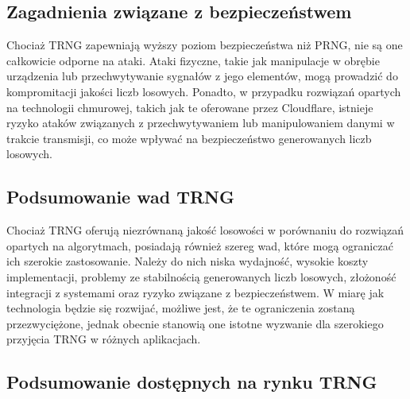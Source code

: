 \subsection{Zagadnienia związane z bezpieczeństwem}

Chociaż TRNG zapewniają wyższy poziom bezpieczeństwa niż PRNG, nie są one całkowicie odporne na ataki. Ataki fizyczne, takie jak manipulacje w obrębie urządzenia lub przechwytywanie sygnałów z jego elementów, mogą prowadzić do kompromitacji jakości liczb losowych. Ponadto, w przypadku rozwiązań opartych na technologii chmurowej, takich jak te oferowane przez Cloudflare, istnieje ryzyko ataków związanych z przechwytywaniem lub manipulowaniem danymi w trakcie transmisji, co może wpływać na bezpieczeństwo generowanych liczb losowych.

\subsection{Podsumowanie wad TRNG}

Chociaż TRNG oferują niezrównaną jakość losowości w porównaniu do rozwiązań opartych na algorytmach, posiadają również szereg wad, które mogą ograniczać ich szerokie zastosowanie. Należy do nich niska wydajność, wysokie koszty implementacji, problemy ze stabilnością generowanych liczb losowych, złożoność integracji z systemami oraz ryzyko związane z bezpieczeństwem. W miarę jak technologia będzie się rozwijać, możliwe jest, że te ograniczenia zostaną przezwyciężone, jednak obecnie stanowią one istotne wyzwanie dla szerokiego przyjęcia TRNG w różnych aplikacjach.

\subsection{Podsumowanie dostępnych na rynku TRNG}